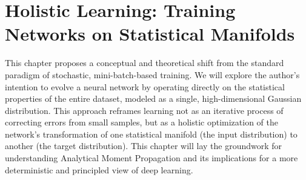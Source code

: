 \ifdefined\ispartofbook
\else
  
  
\fi

\chapter{Holistic Learning: Training Networks on Statistical Manifolds}
\label{chap:holistic_learning}


This chapter proposes a conceptual and theoretical shift from the standard paradigm of stochastic, mini-batch-based training. We will explore the author's intention to evolve a neural network by operating directly on the statistical properties of the entire dataset, modeled as a single, high-dimensional Gaussian distribution. This approach reframes learning not as an iterative process of correcting errors from small samples, but as a holistic optimization of the network's transformation of one statistical manifold (the input distribution) to another (the target distribution). This chapter will lay the groundwork for understanding Analytical Moment Propagation and its implications for a more deterministic and principled view of deep learning.






\ifdefined\ispartofbook
\else
  
  
\fi
